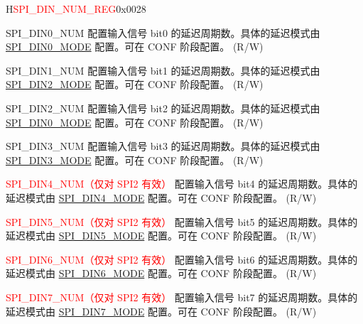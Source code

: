 \begin{register}{H}{\textcolor{red}{SPI\_DIN\_NUM\_REG}}{0x{}0028}\label{regdesc:SPIDINNUMREG}
%
%
%
%
%
%
%
%
%
\regnewline%
\begin{regdesc}\begin{reglist}
\label{fielddesc:SPIDIN0NUM}\item [SPI\_DIN0\_NUM] 配置输入信号 bit0 的延迟周期数。具体的延迟模式由 \hyperref[fielddesc:SPIDIN0MODE]{SPI\_DIN0\_MODE} 配置。可在 CONF 阶段配置。 (R/W)
\label{fielddesc:SPIDIN1NUM}\item [SPI\_DIN1\_NUM] 配置输入信号 bit1 的延迟周期数。具体的延迟模式由 \hyperref[fielddesc:SPIDIN2MODE]{SPI\_DIN2\_MODE} 配置。可在 CONF 阶段配置。 (R/W)
\label{fielddesc:SPIDIN2NUM}\item [SPI\_DIN2\_NUM] 配置输入信号 bit2 的延迟周期数。具体的延迟模式由 \hyperref[fielddesc:SPIDIN0MODE]{SPI\_DIN0\_MODE} 配置。可在 CONF 阶段配置。 (R/W)
\label{fielddesc:SPIDIN3NUM}\item [SPI\_DIN3\_NUM] 配置输入信号 bit3 的延迟周期数。具体的延迟模式由 \hyperref[fielddesc:SPIDIN3MODE]{SPI\_DIN3\_MODE} 配置。可在 CONF 阶段配置。 (R/W)
\label{fielddesc:SPIDIN4NUM}\item [\textcolor{red}{SPI\_DIN4\_NUM（仅对 SPI2 有效）}] 配置输入信号 bit4 的延迟周期数。具体的延迟模式由 \hyperref[fielddesc:SPIDIN4MODE]{SPI\_DIN4\_MODE} 配置。可在 CONF 阶段配置。 (R/W)
\label{fielddesc:SPIDIN5NUM}\item [\textcolor{red}{SPI\_DIN5\_NUM（仅对 SPI2 有效）}] 配置输入信号 bit5 的延迟周期数。具体的延迟模式由 \hyperref[fielddesc:SPIDIN5MODE]{SPI\_DIN5\_MODE} 配置。可在 CONF 阶段配置。 (R/W)
\label{fielddesc:SPIDIN6NUM}\item [\textcolor{red}{SPI\_DIN6\_NUM（仅对 SPI2 有效）}] 配置输入信号 bit6 的延迟周期数。具体的延迟模式由 \hyperref[fielddesc:SPIDIN6MODE]{SPI\_DIN6\_MODE} 配置。可在 CONF 阶段配置。 (R/W)
\label{fielddesc:SPIDIN7NUM}\item [\textcolor{red}{SPI\_DIN7\_NUM（仅对 SPI2 有效）}] 配置输入信号 bit7 的延迟周期数。具体的延迟模式由 \hyperref[fielddesc:SPIDIN7MODE]{SPI\_DIN7\_MODE} 配置。可在 CONF 阶段配置。 (R/W)
\end{reglist}\end{regdesc}
\end{register}


